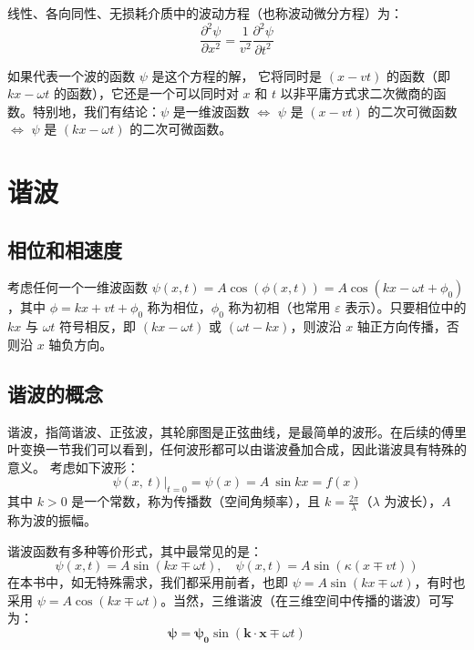 \documentclass[UTF8]{report}
\theoremstyle{MyLineTheoremStyle} %
\theoremstyle{MyBlockTheoremStyle} %
\theoremstyle{MySubsubsectionStyle} %
\begin{document}
线性、各向同性、无损耗介质中的波动方程（也称波动微分方程）为：
\begin{equation}
    \frac{\partial^{2}\psi}{\partial x^{2}}=\frac{1}{v^{2}}\frac{\partial^{2}\psi}{\partial t^{2}} 
\end{equation}

如果代表一个波的函数 $\psi$ 是这个方程的解， 它将同时是 $(x-vt)$ 的函数（即 $kx - \omega t$ 的函数），它还是一个可以同时对 $x$ 和 $t$ 以非平庸方式求二次微商的函数。特别地，我们有结论：$\psi$ 是一维波函数 $\Longleftrightarrow$ $\psi$ 是 $(x-vt)$ 的二次可微函数 $\Longleftrightarrow$ $\psi$ 是 $(kx - \omega t)$ 的二次可微函数。

\section{谐波}

\subsection{相位和相速度}
考虑任何一个一维波函数 $\psi(x,t) = A \cos(\phi(x,t)) = A \cos (kx - \omega t + \phi_0) $，其中 $\phi = kx+vt + \phi_0$ 称为相位，$\phi_0$ 称为初相（也常用 $\varepsilon$ 表示）。只要相位中的 $kx$ 与 $\omega t$ 符号相反，即 $(kx - \omega t)$ 或 $(\omega t - kx)$，则波沿 $x$ 轴正方向传播，否则沿 $x$ 轴负方向。


\subsection{谐波的概念} 
谐波，指简谐波、正弦波，其轮廓图是正弦曲线，是最简单的波形。在后续的傅里叶变换一节我们可以看到，任何波形都可以由谐波叠加合成，因此谐波具有特殊的意义。
考虑如下波形：
\begin{equation}
    \psi(x,\:t)\big|_{t=0}=\psi(x)=A\:\sin kx=f(x)
\end{equation}
其中 $k>0$ 是一个常数，称为传播数（空间角频率），且 $k = \frac{2\pi}{\lambda} $（$\lambda$ 为波长），$A$ 称为波的振幅。\par

谐波函数有多种等价形式，其中最常见的是：
\begin{equation}
    \psi(x,t)=A\sin(kx\mp\omega t) ,\quad \psi(x,t)=A\sin \left(  \kappa (x\mp vt) \right)
\end{equation}
在本书中，如无特殊需求，我们都采用前者，也即 $\psi = A\sin(kx\mp\omega t)$，有时也采用 $\psi = A\cos(kx\mp\omega t)$。当然，三维谐波（在三维空间中传播的谐波）可写为：
\begin{equation}
    \boldsymbol{\psi}=\boldsymbol{\psi_0}\sin(\boldsymbol{k}\cdot \boldsymbol{x} \mp \omega t)
\end{equation}
\end{document}
